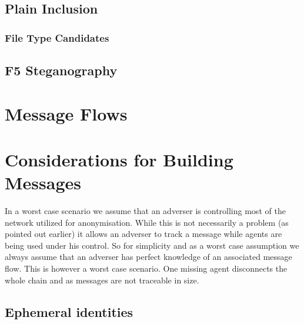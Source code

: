 



\subsection{Plain Inclusion}

\subsubsection{File Type Candidates}


\subsection{F5 Steganography}


\section{Message Flows}


\section{Considerations for Building Messages}
In a worst case scenario we assume that an adverser is controlling most of the network utilized for anonymisation. While this is not necessarily a problem (as pointed out earlier) it allows an adverser to track a message while agents are being used under his control. So for simplicity and as a worst case assumption we always assume that an adverser has perfect knowledge of an associated message flow. This is however a worst case scenario. One missing agent disconnects the whole chain and as messages are not traceable in size.


\subsection{Ephemeral identities}

